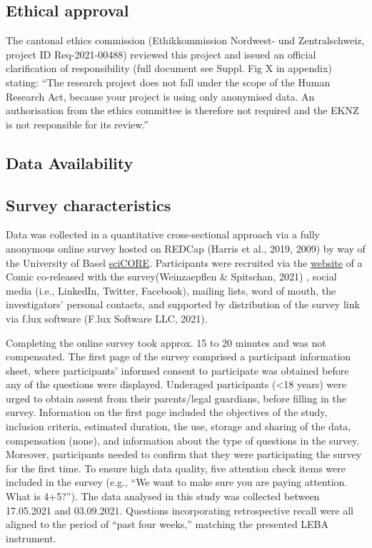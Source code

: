 \documentclass[
  english,
  man]{apa6}
\begin{document}
\hypertarget{ethical-approval}{%
\subsection{Ethical approval}\label{ethical-approval}}

The cantonal ethics commission (Ethikkommission Nordwest- und Zentralschweiz, project ID Req-2021-00488) reviewed this project and issued an official clarification of responsibility (full document see Suppl. Fig X in appendix) stating: ``The research project does not fall under the scope of the Human Research Act, because your project is using only anonymised data. An authorisation from the ethics committee is therefore not required and the EKNZ is not responsible for its review.''

\hypertarget{data-availability}{%
\subsection{Data Availability}\label{data-availability}}

\hypertarget{survey-characteristics}{%
\subsection{Survey characteristics}\label{survey-characteristics}}

Data was collected in a quantitative cross-sectional approach via a fully anonymous online survey hosted on REDCap (Harris et al., 2019, 2009) by way of the University of Basel \href{https://redcap.scicore.unibas.ch}{sciCORE}. Participants were recruited via the \href{https://enlightenyourclock.org/participate-in-research}{website} of a Comic co-released with the survey(Weinzaepflen \& Spitschan, 2021) , social media (i.e., LinkedIn, Twitter, Facebook), mailing lists, word of mouth, the investigators' personal contacts, and supported by distribution of the survey link via f.lux software (F.lux Software LLC, 2021).

Completing the online survey took approx. 15 to 20 minutes and was not compensated. The first page of the survey comprised a participant information sheet, where participants' informed consent to participate was obtained before any of the questions were displayed. Underaged participants (\textless18 years) were urged to obtain assent from their parents/legal guardians, before filling in the survey. Information on the first page included the objectives of the study, inclusion criteria, estimated duration, the use, storage and sharing of the data, compensation (none), and information about the type of questions in the survey. Moreover, participants needed to confirm that they were participating the survey for the first time. To ensure high data quality, five attention check items were included in the survey (e.g., ``We want to make sure you are paying attention. What is 4+5?''). The data analysed in this study was collected between 17.05.2021 and 03.09.2021. Questions incorporating retrospective recall were all aligned to the period of ``past four weeks,'' matching the presented LEBA instrument.
\end{document}
